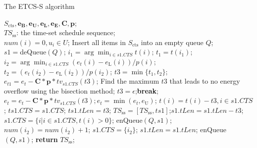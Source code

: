 \documentclass[journal,10pt]{IEEEtran}
\begin{document}
\begin{algorithm}[!htb]
\caption{The ETCS-S algorithm}
\begin{algorithmic}[1]\label{Alg_ETCS_S}
    \REQUIRE $S_\text{cts},\mathbf{e_B}, \mathbf{e_U}, \mathbf{e_L}, \mathbf{e_E}, \mathbf{C}, \mathbf{p}$;\\
    \ENSURE $TS_\text{ss}$: the time-set schedule sequence;\\
    \STATE $num(i)=0, u_i{\in}U$; Insert all items in $S_\text{cts}$ into an empty queue $Q$; \\
        \STATE $s1{=}$deQueue$(Q)$;
        \STATE $i_1{=}\arg \min_{i{\in}s1.CTS}t(i)$; $t_1{=}t(i_1)$; \label{line_timelen_time}
        \STATE $i_2{=}\arg \min_{i{\in}s1.CTS}(e_t(i){-}e_\text{L}(i))/p(i)$; $t_2{=}(e_t(i_2){-}e_\text{L}(i_2))/p(i_2)$; \label{line_timelen_emin}
            \STATE $t3{=}\min\{t_1,t_2\}$;
            \STATE $e_{t1}{=}e_t{-}\mathbf{C}{*}\mathbf{p}{*}tv_{s1.CTS}(t3)$;
                \STATE Find the maximum $t3$ that leads to no energy overflow using the bisection method;\label{line_timelen_emax}
                    \STATE $t3{=}\epsilon$;\textbf{break};\label{slicelen2epsilon}
                \ENDIF
            \ENDWHILE
            \STATE $e_{t}{=}e_t{-}\mathbf{C}{*}\mathbf{p}{*}tv_{s1.CTS}(t3); e_{t}{=}\min{(e_{t},e_\text{U})}$;
            \STATE $t(i){=}t(i){-}t3, i{\in}s1.CTS$;
            \STATE $ts1.CTS{=}s1.CTS$; $ts1.tLen{=}t3$;
            \STATE $TS_\text{ss}{=}[TS_\text{ss},ts1]$;$s1.tLen{=}s1.tLen{-}t3$;
            \STATE $s1.CTS{=}\{i|i{\in}s1.CTS, t(i){>}0\}$;
                \STATE enQueue$(Q,s1)$;
            \ENDIF
        \ELSE
            \STATE $num(i_2){=}num(i_2){+}1$;
                \STATE $s1.CTS{=}\{i_2\}$; $s1.tLen{=}s1.tLen$;
                \STATE enQueue$(Q,s1)$;
            \ENDIF
        \ENDIF
     \ENDWHILE
     \STATE \textbf{return} $TS_\text{ss}$;
\end{algorithmic}
\end{algorithm}
\end{document}
